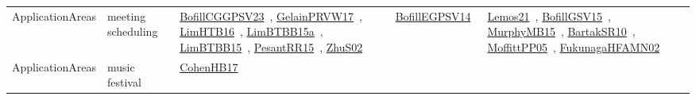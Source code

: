 {\begin{longtable}{lp{3cm}>{\raggedright\arraybackslash}p{6cm}>{\raggedright\arraybackslash}p{6cm}>{\raggedright\arraybackslash}p{8cm}}
\index{meeting scheduling}\index{ApplicationAreas!meeting scheduling}ApplicationAreas & meeting scheduling & \href{../works/BofillCGGPSV23.pdf}{BofillCGGPSV23}~\cite{BofillCGGPSV23}, \href{../works/GelainPRVW17.pdf}{GelainPRVW17}~\cite{GelainPRVW17}, \href{../works/LimHTB16.pdf}{LimHTB16}~\cite{LimHTB16}, \href{../works/LimBTBB15a.pdf}{LimBTBB15a}~\cite{LimBTBB15a}, \href{../works/LimBTBB15.pdf}{LimBTBB15}~\cite{LimBTBB15}, \href{../works/PesantRR15.pdf}{PesantRR15}~\cite{PesantRR15}, \href{../works/ZhuS02.pdf}{ZhuS02}~\cite{ZhuS02} & \href{../works/BofillEGPSV14.pdf}{BofillEGPSV14}~\cite{BofillEGPSV14} & \href{../works/Lemos21.pdf}{Lemos21}~\cite{Lemos21}, \href{../works/BofillGSV15.pdf}{BofillGSV15}~\cite{BofillGSV15}, \href{../works/MurphyMB15.pdf}{MurphyMB15}~\cite{MurphyMB15}, \href{../works/BartakSR10.pdf}{BartakSR10}~\cite{BartakSR10}, \href{../works/MoffittPP05.pdf}{MoffittPP05}~\cite{MoffittPP05}, \href{../works/FukunagaHFAMN02.pdf}{FukunagaHFAMN02}~\cite{FukunagaHFAMN02}\\
\index{music festival}\index{ApplicationAreas!music festival}ApplicationAreas & music festival & \href{../works/CohenHB17.pdf}{CohenHB17}~\cite{CohenHB17} &  & \\

\end{longtable}}

